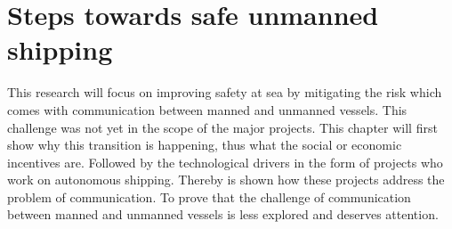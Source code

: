 \chapter{Steps towards safe unmanned shipping}
\label{ch:future}
This research will focus on improving safety at sea by mitigating the risk which comes with communication between manned and unmanned vessels. This challenge was not yet in the scope of the major projects. This chapter will first show why this transition is happening, thus what the social or economic incentives are. Followed by the technological drivers in the form of projects who work on autonomous shipping. Thereby is shown how these projects address the problem of communication. To prove that the challenge of communication between manned and unmanned vessels is less explored and deserves attention.

